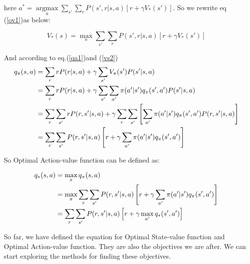     here $a^*= \mathop{\arg \max}\limits_{a}\sum_{s'}\sum_{r}P(s',r|s,a)[r+\gamma V_*(s')]$. So we rewrite eq (\ref{ov1})as below:

    \begin{equation}\label{ov2}
        V_*(s) = \max_{a}\sum_{s'}\sum_{r}P(s',r|s,a)[r+\gamma V_{*}(s')] 
    \end{equation}

    And according to eq.(\ref{qa1})and (\ref{vs2})
    \begin{align}
        q_{\pi}(s,a) & = \sum_rrP(r|s,a) + \gamma \sum_{s'}V_{\pi}(s')P(s'|s,a) \notag \\
                     & = \sum_rrP(r|s,a) + \gamma \sum_{s'}\sum_{a'}\pi (a'|s') q_{\pi}(s',a')P(s'|s,a) \notag \\
                     & = \sum_r\sum_{s'}rP(r,s'|s,a) + \gamma \sum_{r}\sum_{s'}\left [\sum_{a'}\pi
                    (a'|s')q_{\pi}(s',a')P(r,s'|s,a)\right ] \notag \\
                    & = \sum_r\sum_{s'}P(r,s'|s,a)\left [r+\gamma \sum_{a'}\pi (a'|s')q_{\pi}(s',a')\right ]
    \end{align}

    So Optimal Action-value function can be defined as:

    \begin{definition}
        \begin{align}\label{oq1}
            q_*(s,a) & = \max_{\pi}q_{\pi}(s,a) \notag \\
                     & = \max_{\pi}\sum_r\sum_{s'}P(r,s'|s,a)\left [r+\gamma \sum_{a'}\pi (a'|s')q_{\pi}(s',a')\right ] \notag \\
                     & = \sum_r\sum_{s'}P(r,s'|s,a)\left [r+\gamma \max_{a'}q_*(s',a')\right ]
        \end{align}       
    \end{definition}
    
    So far, we have defined the equation for Optimal State-value function and Optimal Action-value function. They are also the objectives we are after. We can start exploring the methods for finding these objectives.
     
